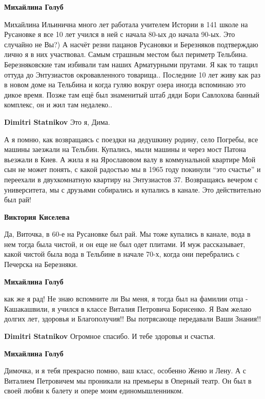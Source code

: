 \begin{itemize}
\begin{itemize}
\textbf{Михайлина Голуб} 

Михайлина Ильинична много лет работала учителем Истории в 141 школе на
Русановке я все 10 лет учился в ней с начала 80-ых до начала 90-ых. Это
случайно не Вы?) А насчёт резни пацанов Русановки и Березняков подтверждаю
лично я в них участвовал. Самым страшным местом был периметр Тельбина.
Березняковские там избивали там наших Арматурными прутами. Я как то тащил
оттуда до Энтузиастов окровавленного товарища.. Последние 10 лет живу как раз в
новом доме на Тельбина и когда гуляю вокруг озера иногда вспоминаю это дикое
время. Позже там ещё был знаменитый штаб дяди Бори Савлохова банный комплекс,
он и жил там недалеко..

\textbf{Dimitri Statnikov} Это я, Дима.


А я помню, как возвращаясь с поездки на дедушкину родину, село Погребы, все
машины заезжали на Тельбин. Купались, мыли машины и через мост Патона вьезжали
в Киев. А жила я на Ярославовом валу в коммунальной квартире Мой сын не может
понять, с какой радостью мы в 1965 году покинули \enquote{это счастье} и переехали в
двухкомнатную квартиру на Энтузиастов 37. Возвращаясь вечером с университета,
мы с друзьями собирались и купались в канале. Это действительно был рай!

\begin{itemize} %
\textbf{Виктория Киселева} 

Да, Виточка, в 60-е на Русановке был рай. Мы тоже купались в канале, вода в нем
тогда была чистой, и он еще не был одет плитами. И муж рассказывает, какой
чистой была вода в Тельбине в начале 70-х, когда они перебрались с Печерска на
Березняки.

\end{itemize} %

\textbf{Михайлина Голуб} 

как же я рад! Не знаю вспомните ли Вы меня, я тогда был на фамилии отца -
Кашакашвили, я учился в классе Виталия Петровича Борисенко. Я Вам желаю долгих
лет, здоровья и Благополучия!! Вы потрясающе передавали Ваши Знания!!


\textbf{Dimitri Statnikov} Огромное спасибо. И тебе здоровья и счастья.

\textbf{Михайлина Голуб}

Димочка, и я тебя прекрасно помню, ваш класс, особенно Женю и Лену. А с
Виталием Петровичем мы проникали на премьеры в Оперный театр. Он был в своей
любви к балету и опере моим единомышленником.


\end{itemize}
\end{itemize}
